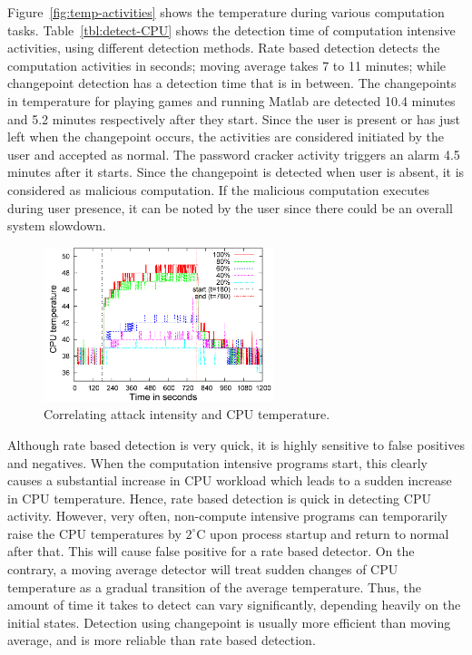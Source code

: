 Figure~\ref{fig:temp-activities} shows the temperature during various
computation tasks.
Table~\ref{tbl:detect-CPU} shows the detection time of computation
intensive activities, using different detection methods.
Rate based detection detects the computation activities in seconds;
moving average takes 7 to 11 minutes;
while changepoint detection has a detection time that is in between.
The changepoints in temperature for playing games
and running Matlab are detected 10.4 minutes and 5.2
minutes respectively after they start. Since the user is present or
has just left when the changepoint occurs, the activities are considered
initiated by the user and accepted as normal. The password cracker
activity triggers an alarm 4.5 minutes after it starts. Since the
changepoint is detected when user is absent, it is considered as
malicious computation. If the malicious computation executes during
user presence, it can be noted by the user since there could be an
overall system slowdown.

\begin{figure}[tb]
\centering
\includegraphics[width=0.6\textwidth]{sensor/passwd-line.png}
\caption{Correlating attack intensity and CPU temperature. }
\label{fig:pwd-vary}
\end{figure}

Although rate based detection is very quick, it is highly sensitive to
false positives and negatives. When the computation intensive programs start, 
this clearly causes a substantial increase in CPU workload
which leads to a sudden increase in CPU temperature. 
Hence, rate based detection is quick in detecting CPU activity.
However, very often, non-compute intensive programs can temporarily raise
the CPU temperatures by $2^\circ$C upon process startup and return to normal
after that. This will cause false positive for a rate based detector. 
On the contrary, a moving average detector will treat
sudden changes of CPU temperature as a gradual transition 
of the average temperature. Thus, the amount of time
it takes to detect can vary significantly,
depending heavily on the initial states. 
Detection using changepoint is usually more efficient than moving average, 
and is more reliable than rate based detection.

